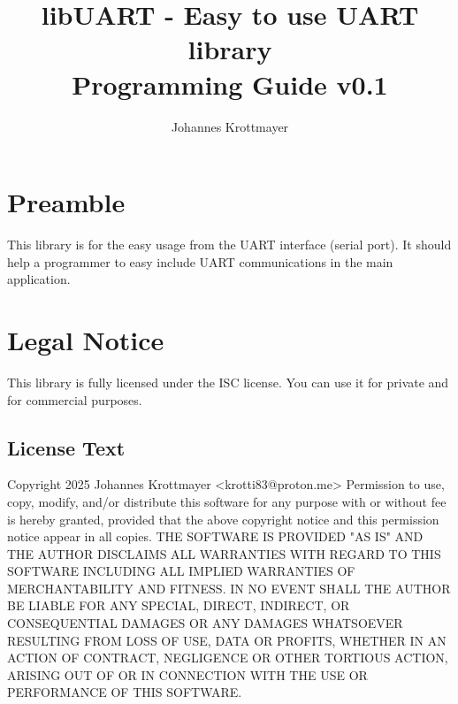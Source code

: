 \documentclass[10pt, a4paper]{report}
\title{libUART - Easy to use UART library \\ Programming Guide v0.1}
\author{Johannes Krottmayer}
\begin{document}
\maketitle
\tableofcontents
\chapter{Preamble}
This library is for the easy usage from the UART interface (serial port). It should help
a programmer to easy include UART communications in the main application.
\chapter{Legal Notice}
This library is fully licensed under the ISC license. You can use it for private and
for commercial purposes.
\section{License Text}
Copyright 2025 Johannes Krottmayer <krotti83@proton.me>\newline
\newline
Permission to use, copy, modify, and/or distribute this software for any
purpose with or without fee is hereby granted, provided that the above
copyright notice and this permission notice appear in all copies.\newline
\newline
THE SOFTWARE IS PROVIDED "AS IS" AND THE AUTHOR DISCLAIMS ALL WARRANTIES
WITH REGARD TO THIS SOFTWARE INCLUDING ALL IMPLIED WARRANTIES OF
MERCHANTABILITY AND FITNESS. IN NO EVENT SHALL THE AUTHOR BE LIABLE FOR
ANY SPECIAL, DIRECT, INDIRECT, OR CONSEQUENTIAL DAMAGES OR ANY DAMAGES
WHATSOEVER RESULTING FROM LOSS OF USE, DATA OR PROFITS, WHETHER IN AN
ACTION OF CONTRACT, NEGLIGENCE OR OTHER TORTIOUS ACTION, ARISING OUT OF
OR IN CONNECTION WITH THE USE OR PERFORMANCE OF THIS SOFTWARE.
\end{document}
